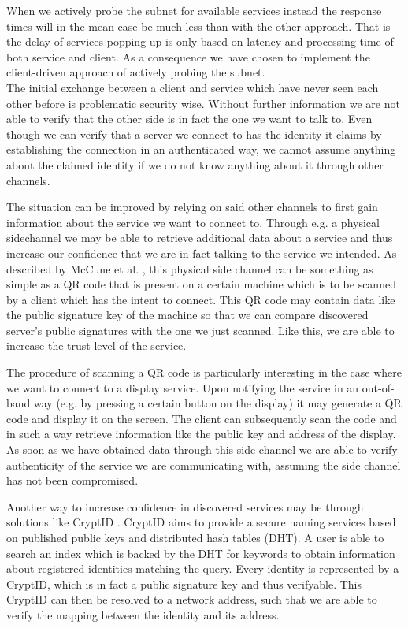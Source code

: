 When we actively probe the subnet for available services instead the response times will in the mean case be much less than with the other approach.
That is the delay of services popping up is only based on latency and processing time of both service and client.
As a consequence we have chosen to implement the client-driven approach of actively probing the subnet.\\


The initial exchange between a client and service which have never seen each other before is problematic security wise.
Without further information we are not able to verify that the other side is in fact the one we want to talk to.
Even though we can verify that a server we connect to has the identity it claims by establishing the connection in an authenticated way, we cannot assume anything about the claimed identity if we do not know anything about it through other channels.

The situation can be improved by relying on said other channels to first gain information about the service we want to connect to.
Through e.g. a physical sidechannel we may be able to retrieve additional data about a service and thus increase our confidence that we are in fact talking to the service we intended.
As described by McCune et al. \cite{mccune2005seeing}, this physical side channel can be something as simple as a QR code that is present on a certain machine which is to be scanned by a client which has the intent to connect.
This QR code may contain data like the public signature key of the machine so that we can compare discovered server's public signatures with the one we just scanned.
Like this, we are able to increase the trust level of the service.

The procedure of scanning a QR code is particularly interesting in the case where we want to connect to a display service.
Upon notifying the service in an out-of-band way (e.g. by pressing a certain button on the display) it may generate a QR code and display it on the screen.
The client can subsequently scan the code and in such a way retrieve information like the public key and address of the display.
As soon as we have obtained data through this side channel we are able to verify authenticity of the service we are communicating with, assuming the side channel has not been compromised.

Another way to increase confidence in discovered services may be through solutions like CryptID \cite{malchow2015cryptid}.
CryptID aims to provide a secure naming services based on published public keys and distributed hash tables (DHT).
A user is able to search an index which is backed by the DHT for keywords to obtain information about registered identities matching the query.
Every identity is represented by a CryptID, which is in fact a public signature key and thus verifyable.
This CryptID can then be resolved to a network address, such that we are able to verify the mapping between the identity and its address.\\

